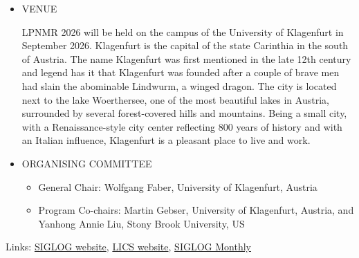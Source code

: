 \documentclass[prodmode,acmtecs]{acmsmall} %
\begin{document}
\begin{itemize}
  LPNMR 2026 aims to bring together researchers from LPNMR and neighboring areas in order to share research experiences, promote collaboration and identify directions for joint future research. 
 
\item  VENUE 
 
  LPNMR 2026 will be held on the campus of the University of Klagenfurt in September 2026. Klagenfurt is the capital of the state Carinthia in the south of Austria. The name Klagenfurt was first mentioned in the late 12th century and legend has it that Klagenfurt was founded after a couple of brave men had slain the abominable Lindwurm, a winged dragon. The city is located next to the lake Woerthersee, one of the most beautiful lakes in Austria, surrounded by several forest-covered hills and mountains. Being a small city, with a Renaissance-style city center reflecting 800 years of history and with an Italian influence, Klagenfurt is a pleasant place to live and work. 
 
\item  ORGANISING COMMITTEE 
 
\begin{itemize}\item  General Chair: Wolfgang Faber, University of Klagenfurt, Austria
\item  Program Co-chairs: Martin Gebser, University of Klagenfurt, Austria, and Yanhong Annie Liu, Stony Brook University, US
\end{itemize} 
\end{itemize}


\bigskip Links: \href{http://siglog.org/}{SIGLOG website}, \href{https://lics.siglog.org}{LICS website}, \href{https://lics.siglog.org/newsletters/}{SIGLOG Monthly}
\end{document}
